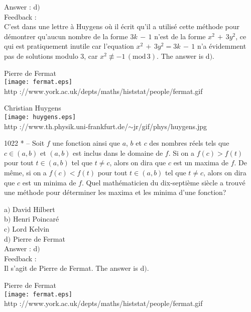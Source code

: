\documentclass[letterpaper, 12pt]{article}
\begin{document}
Answer : d$)$\\

Feedback : \\
C'est dans une lettre \`a Huygens o\`u il \'ecrit qu'il a utilis\'e
cette m\'ethode pour d\'emontrer qu'aucun nombre de la forme
$3k\,-\,1$ n'est de la forme $x^2\,+\,3y^2$, ce qui est pratiquement
inutile car l'equation $x^2\,+\,3y^2=3k\,-\,1$ n'a \'evidemment
pas de solutions modulo $3$, car $x^2\not
\equiv-1\,(\mathrm{mod}\,3)$.
The answer is d$)$.\\

        \begin{center}
        Pierre de Fermat\\
    \texttt{[image: fermat.eps]}\\
        {\footnotesize http
://www.york.ac.uk/depts/maths/histstat/people/fermat.gif}
    \end{center}

        \begin{center}
        Christian Huygens\\
    \texttt{[image: huygens.eps]}\\
        {\footnotesize http
://www.th.physik.uni-frankfurt.de/$\sim$jr/gif/phys/huygens.jpg}
    \end{center}

1022 * -- Soit $f$ une fonction ainsi que $a$, $b$ et $c$ des
nombres r\'eels tels que $c\in(a,b)$ et $(a,b)$ est inclus dans le
domaine de $f$. Si on a $f(c)>f(t)$ pour tout $t\in(a,b)$ tel que
$t\not=c$, alors on dira que $c$ est un maxima de $f$. De m\^eme, si
on a $f(c)<f(t)$ pour tout $t\in(a,b)$ tel que $t\not=c$, alors on
dira que $c$ est un minima de $f$. Quel math\'ematicien du
dix-septi\`eme si\`ecle a trouv\'e une m\'ethode pour d\'eterminer
les maxima et les minima d'une fonction?

a$)$ David Hilbert \\
b$)$ Henri Poincar\'e \\
c$)$ Lord Kelvin \\
d$)$ Pierre de Fermat \\

Answer : d$)$\\

Feedback : \\
Il s'agit de Pierre de Fermat.
The answer is d$)$.\\

        \begin{center}
        Pierre de Fermat\\
    \texttt{[image: fermat.eps]}\\
        {\footnotesize http
://www.york.ac.uk/depts/maths/histstat/people/fermat.gif}
    \end{center}
\end{document}
